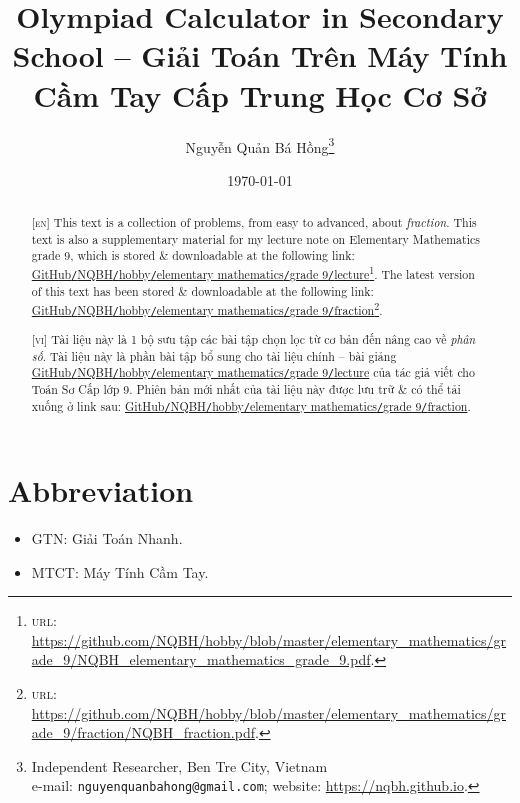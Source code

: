 \documentclass{article}
\title{Olympiad Calculator in Secondary School -- Giải Toán Trên Máy Tính Cầm Tay Cấp Trung Học Cơ Sở}
\author{Nguyễn Quản Bá Hồng\footnote{Independent Researcher, Ben Tre City, Vietnam\\e-mail: \texttt{nguyenquanbahong@gmail.com}; website: \url{https://nqbh.github.io}.}}
\date{\today}
\begin{document}
\maketitle
\begin{abstract}
	\textsc{[en]} This text is a collection of problems, from easy to advanced, about \textit{fraction}. This text is also a supplementary material for my lecture note on Elementary Mathematics grade 9, which is stored \& downloadable at the following link: \href{https://github.com/NQBH/hobby/blob/master/elementary_mathematics/grade_9/NQBH_elementary_mathematics_grade_9.pdf}{GitHub\texttt{/}NQBH\texttt{/}hobby\texttt{/}elementary mathematics\texttt{/}grade 9\texttt{/}lecture}\footnote{\textsc{url}: \url{https://github.com/NQBH/hobby/blob/master/elementary_mathematics/grade_9/NQBH_elementary_mathematics_grade_9.pdf}.}. The latest version of this text has been stored \& downloadable at the following link: \href{https://github.com/NQBH/hobby/blob/master/elementary_mathematics/grade_9/fraction/NQBH_fraction.pdf}{GitHub\texttt{/}NQBH\texttt{/}hobby\texttt{/}elementary mathematics\texttt{/}grade 9\texttt{/}fraction}\footnote{\textsc{url}: \url{https://github.com/NQBH/hobby/blob/master/elementary_mathematics/grade_9/fraction/NQBH_fraction.pdf}.}.
	\vspace{2mm}
	
	\textsc{[vi]} Tài liệu này là 1 bộ sưu tập các bài tập chọn lọc từ cơ bản đến nâng cao về \textit{phân số}. Tài liệu này là phần bài tập bổ sung cho tài liệu chính -- bài giảng \href{https://github.com/NQBH/hobby/blob/master/elementary_mathematics/grade_9/NQBH_elementary_mathematics_grade_9.pdf}{GitHub\texttt{/}NQBH\texttt{/}hobby\texttt{/}elementary mathematics\texttt{/}grade 9\texttt{/}lecture} của tác giả viết cho Toán Sơ Cấp lớp 9. Phiên bản mới nhất của tài liệu này được lưu trữ \& có thể tải xuống ở link sau: \href{https://github.com/NQBH/hobby/blob/master/elementary_mathematics/grade_9/fraction/NQBH_fraction.pdf}{GitHub\texttt{/}NQBH\texttt{/}hobby\texttt{/}elementary mathematics\texttt{/}grade 9\texttt{/}fraction}.
\end{abstract}
\tableofcontents
\newpage


\section*{Abbreviation}

\begin{itemize}
	\item GTN: Giải Toán Nhanh.
	\item MTCT: Máy Tính Cầm Tay.
\end{itemize}
\end{document}
